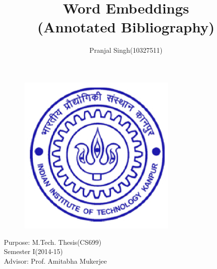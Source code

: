 \documentclass{article}
\title{\textbf{Word Embeddings\\ (Annotated Bibliography)}}
\author{\normalsize Pranjal Singh(10327511)\\}
\begin{document}
\maketitle
\begin{figure}[h!tb]
\centering
\includegraphics[width=8cm,height=8cm]{6.eps}
\end{figure}
\vspace{5cm}
\begin{center}
\large{
Purpose: M.Tech. Thesis(CS699)\\Semester I(2014-15)\\
Advisor: Prof. Amitabha Mukerjee}
\end{center}
\newpage

\nocite{*}


\end{document}

